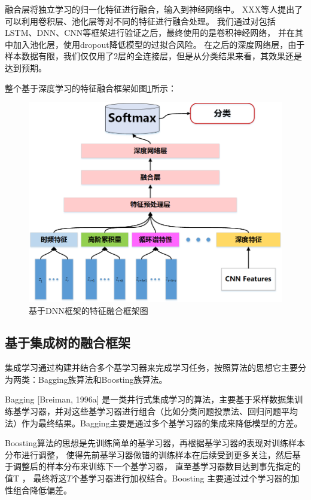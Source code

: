 融合层将独立学习的归一化特征进行融合，输入到神经网络中。
XXX等人提出了可以利用卷积层、池化层等对不同的特征进行融合处理。
我们通过对包括LSTM、DNN、CNN等框架进行验证之后，最终使用的是卷积神经网络，
并在其中加入池化层，使用dropout降低模型的过拟合风险。
在之后的深度网络层，由于样本数据有限，我们仅仅用了2层的全连接层，但是从分类结果来看，其效果还是达到预期。\par


整个基于深度学习的特征融合框架如图\ref{sec:fig_4_3}所示：
\begin{figure}[!h]
	\centering
	\includegraphics[scale=0.6]{figures/chapter_4/fig_4_3}
	\caption{基于DNN框架的特征融合框架图}\label{sec:fig_4_3}
\end{figure}


\subsection{基于集成树的融合框架}
集成学习通过构建并结合多个基学习器来完成学习任务，按照算法的思想它主要分为两类：Bagging族算法和Boosting族算法。\par

Bagging [Breiman, 1996a] 是一类井行式集成学习的算法，主要基于采样数据集训练基学习器，并对这些基学习器进行组合（比如分类问题投票法、回归问题平均法）作为最终结果。Bagging主要是通过多个基学习器的集成来降低模型的方差。

Boosting算法的思想是先训练简单的基学习器，再根据基学习器的表现对训练样本分布进行调整，
使得先前基学习器做错的训练样本在后续受到更多关注，然后基于调整后的样本分布来训练下一个基学习器，
直至基学习器数目达到事先指定的值T ， 最终将这$T$个基学习器进行加权结合。Boosting 主要通过过个学习器的加性组合降低偏差。\par

